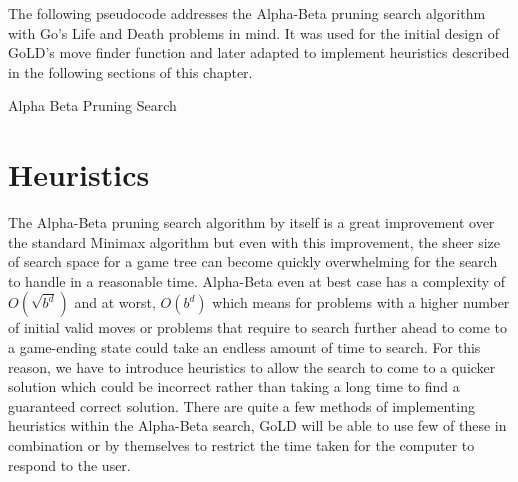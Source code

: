 \documentclass{l4proj}
\begin{document}
The following pseudocode addresses the Alpha-Beta pruning search algorithm with Go's Life and Death problems in mind. It was used for the initial design of GoLD's move finder function and later adapted to implement heuristics described in the following sections of this chapter.

\begin{algorithm}[H]
\caption{Alpha Beta Pruning Search}\label{Alpha-Beta}
    \DontPrintSemicolon
\end{algorithm}





\section{Heuristics}

The Alpha-Beta pruning search algorithm by itself is a great improvement over the standard Minimax algorithm but even with this improvement, the sheer size of search space for a game tree can become quickly overwhelming for the search to handle in a reasonable time. Alpha-Beta even at best case has a complexity of $O(\sqrt{b^d})$ and at worst, $O(b^d)$  which means for problems with a higher number of initial valid moves or problems that require to search further ahead to come to a game-ending state could take an endless amount of time to search. For this reason, we have to introduce heuristics to allow the search to come to a quicker solution which could be incorrect rather than taking a long time to find a guaranteed correct solution. There are quite a few methods of implementing heuristics within the Alpha-Beta search, GoLD will be able to use few of these in combination or by themselves to restrict the time taken for the computer to respond to the user.
\end{document}
